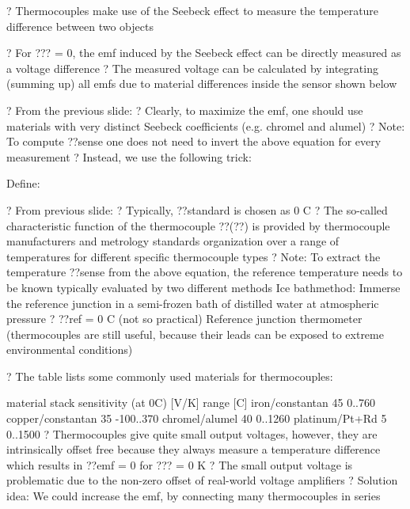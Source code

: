 \documentclass[2pt,landscape]{article}
\begin{document}
\begin{multicols*}{5}
?	Thermocouples make use of the Seebeck effect to measure the 
temperature difference between two objects

?	For ??? = 0, the emf induced by the Seebeck effect can be directly
measured as a voltage difference
?	The measured voltage can be calculated by integrating (\textbullet summing up\textbullet ) 
all emfs due to material differences inside the sensor shown below




?	From the previous slide:
?	Clearly, to maximize the emf, one should use materials with very 
distinct Seebeck coefficients (e.g. chromel and alumel)
?	Note: To compute ??sense one does not need to invert the above 
equation for every measurement
?	Instead, we use the following \textbullet trick\textbullet :

Define:





?	From previous slide:
?	Typically, ??standard is chosen as 0 \textbullet C
?	The so-called characteristic function of the thermocouple ??(??) is 
provided by thermocouple manufacturers and metrology standards 
organization over a range of temperatures for different specific 
thermocouple types
?	Note: To extract the temperature ??sense from the above equation, the 
reference temperature needs to be known
typically evaluated by two different methods
\textbullet 	\textbullet Ice bath\textbullet method: Immerse the reference junction in a semi-frozen bath of 
distilled water at atmospheric pressure ? ??ref = 0 \textbullet C (not so practical)
\textbullet 	Reference junction thermometer (thermocouples are still useful, because 
their leads can be exposed to extreme environmental conditions)



?	The table lists some commonly used materials for thermocouples:

material stack
sensitivity (at 0\textbullet C) 
[\textbullet V/K]
range [\textbullet C]
iron/constantan
45
0..760
copper/constantan
35
-100..370
chromel/alumel
40
0..1260
platinum/Pt+Rd
5
0..1500
?		Thermocouples give quite small output voltages, however, they 
are intrinsically offset free because they always measure a 
temperature difference which results in ??emf = 0 for ??? = 0 K
?	The small output voltage is problematic due to the non-zero offset of 
real-world voltage amplifiers
?	Solution idea:
We could increase the emf, by connecting many thermocouples in 
series \textbullet 




\end{multicols*}
\end{document}
